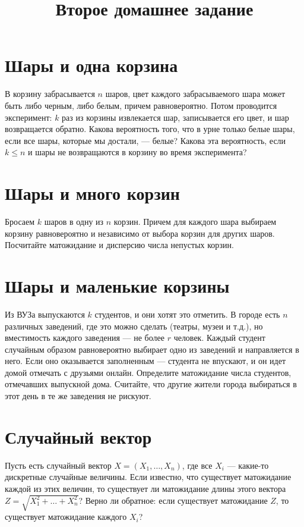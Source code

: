 \documentclass[12pt]{article}
\title{Второе домашнее задание}
\begin{document}
\maketitle

\section{Шары и одна корзина}

В корзину забрасывается $n$ шаров, цвет каждого забрасываемого шара может быть либо черным, либо белым, причем равновероятно. Потом проводится эксперимент: $k$ раз из корзины извлекается шар, записывается его цвет, и шар возвращается обратно. Какова вероятность того, что в урне только белые шары, если все шары, которые мы достали, --- белые? Какова эта вероятность, если $k \le n$ и шары не возвращаются в корзину во время эксперимента?

\section{Шары и много корзин}

Бросаем $k$ шаров в одну из $n$ корзин. Причем для каждого шара выбираем корзину равновероятно и независимо от выбора корзин для других шаров. Посчитайте матожидание и дисперсию числа непустых корзин.

\section{Шары и маленькие корзины}

Из ВУЗа выпускаются $k$ студентов, и они хотят это отметить. В городе есть $n$ различных заведений, где это можно сделать (театры, музеи и т.д.), но вместимость каждого заведения --- не более $r$ человек. Каждый студент случайным образом равновероятно выбирает одно из заведений и направляется в него. Если оно оказывается заполненным --- студента не впускают, и он идет домой отмечать с друзьями онлайн. Определите матожидание числа студентов, отмечавших выпускной дома. Считайте, что другие жители города выбираться в этот день в те же заведения не рискуют. 

\section{Случайный вектор}

Пусть есть случайный вектор $X = (X_1, \dots, X_n)$, где все $X_i$ --- какие-то дискретные случайные величины. Если известно, что существует матожидание каждой из этих величин, то существует ли матожидание длины этого вектора $Z = \sqrt{X_1^2 + \dots + X_n^2}$? Верно ли обратное: если существует матожидание $Z$, то существует матожидание каждого $X_i$?
\end{document}
